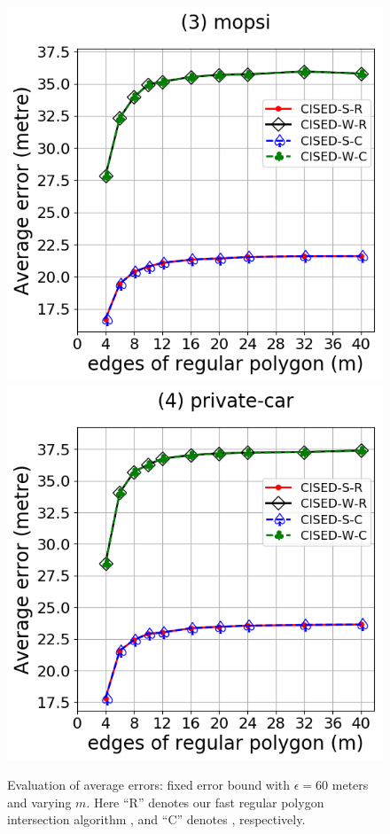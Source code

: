 {\begin{figure}[tb!]
	\includegraphics[scale = 0.2900]{Figures/Exp-M-e-60-error-mopsi.png}\hspace{1ex}
	\includegraphics[scale = 0.2900]{Figures/Exp-M-e-60-error-private.png}
	\caption{\small Evaluation of average errors: fixed error bound with $\epsilon = 60$ meters and varying $m$.
Here ``R'' denotes our fast regular polygon intersection algorithm \rpia, and ``C'' denotes \cpia, respectively.}
	\label{fig:m-error-e60}
\end{figure}


}
